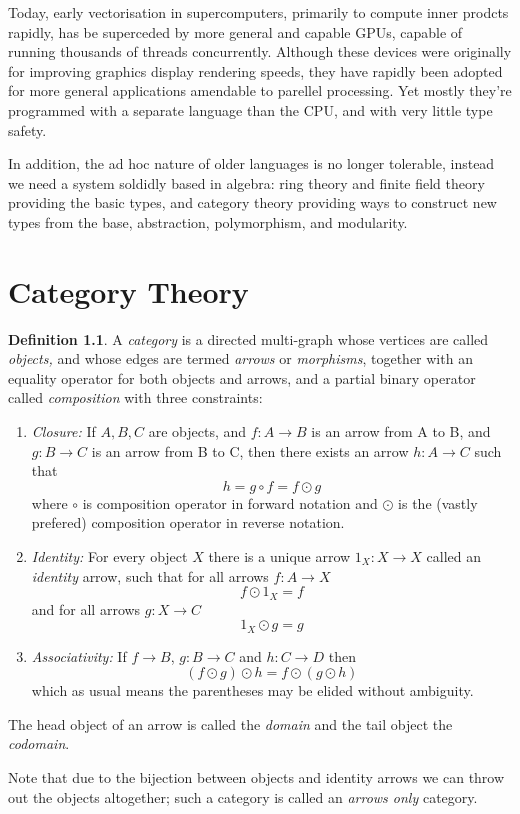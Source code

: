 \documentclass[oneside]{book}
\theoremstyle{plain}
\theoremstyle{definition}
\newtheorem{definition}{Definition}
\theoremstyle{plain}
\begin{document}
Today, early vectorisation in supercomputers, primarily to compute
inner prodcts rapidly, has be superceded by more general and 
capable GPUs, capable of running thousands of threads concurrently.
Although these devices were originally for improving graphics display
rendering speeds, they have rapidly been adopted for more general
applications amendable to parellel processing. Yet mostly they're
programmed with a separate language than the CPU, and with very
little type safety.

\begin{ycomment}
In addition, the ad hoc nature of older languages is no longer tolerable,
instead we need a system soldidly based in algebra: ring theory and finite field
theory providing the basic types, and category theory providing ways to
construct new types from the base, abstraction, polymorphism, and modularity.
\end{ycomment}


\chapter{Category Theory}
\begin{definition}
A {\em category} is a directed multi-graph whose vertices are called {\em objects,}
and whose edges are termed {\em arrows} or {\em morphisms},
together with an equality operator for both objects and arrows,
and a partial binary operator called {\em composition} with three 
constraints:
\begin{enumerate}
\item {\em Closure:} If $A,B,C$ are objects, and $f:A\rightarrow B$ is an arrow
from A to B, and $g:B\rightarrow C$ is an arrow from B to C,
then there exists an arrow $h:A\rightarrow C$ such that
$$h = g \circ f = f \odot g$$
where $\circ$ is composition operator in forward notation and $\odot$
is the (vastly prefered) composition operator in reverse notation.
\item {\em Identity:} For every object $X$ there is a unique arrow $1_X:X\rightarrow X$
called an {\em identity} arrow, such that for all arrows $f:A\rightarrow X$
$$f \odot 1_X = f$$
and for all arrows $g:X\rightarrow C$
$$1_X \odot g = g$$
\item {\em Associativity:} If $f\rightarrow B$, $g:B\rightarrow C$ and $h:C\rightarrow D$ then
$$(f\odot g) \odot h = f\odot (g \odot h)$$
which as usual means the parentheses may be elided without ambiguity.
\end{enumerate}
The head object of an arrow is called the {\em domain} and the tail
object the {\em codomain}.

Note that due to the bijection between objects and identity arrows
we can throw out the objects altogether; such a category is called
an {\em arrows only} category. 
\end{definition}
\end{document}
